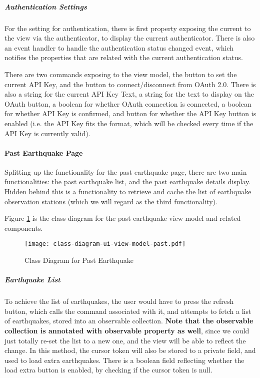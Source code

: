 \subparagraph{Authentication Settings}

For the setting for authentication, there is first property exposing the current  to the view via the authenticator, to display the current authenticator. There is also an event handler to handle the authentication status changed event, which notifies the properties that are related with the current authentication status.

There are two commands exposing to the view model, the button to set the current API Key, and the button to connect/disconnect from OAuth 2.0. There is also a string for the current API Key Text, a string for the text to display on the OAuth button, a boolean for whether OAuth connection is connected, a boolean for whether API Key is confirmed, and button for whether the API Key button is enabled (i.e. the API Key fits the format, which will be checked every time if the API Key is currently valid).

\paragraph{Past Earthquake Page}

Splitting up the functionality for the past earthquake page, there are two main functionalities: the past earthquake list, and the past earthquake details display. Hidden behind this is a functionality to retrieve and cache the list of earthquake observation stations (which we will regard as the third functionality).

Figure \ref{fig:class-diagram-ui-past} is the class diagram for the past earthquake view model and related components.

\begin{figure}[htp]
    \centering
    \texttt{[image: class-diagram-ui-view-model-past.pdf]}
    \caption{Class Diagram for Past Earthquake}
    \label{fig:class-diagram-ui-past}
\end{figure}

\subparagraph{Earthquake List}

To achieve the list of earthquakes, the user would have to press the refresh button, which calls the command associated with it, and attempts to fetch a list of earthquakes, stored into an observable collection. \textbf{Note that the observable collection is annotated with observable property as well}, since we could just totally re-set the list to a new one, and the view will be able to reflect the change. In this method, the cursor token will also be stored to a private field, and used to load extra earthquakes. There is a boolean field reflecting whether the load extra button is enabled, by checking if the cursor token is null.

